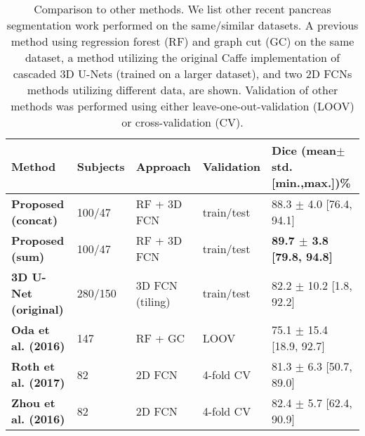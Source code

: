 \documentclass[a4paper]{spie}  %
\begin{document}
\begin{table}[htb]
\small
\centering
\caption{ Comparison to other methods. We list other recent pancreas segmentation work performed on the same/similar datasets. A previous method using regression forest (RF) and graph cut (GC)\cite{oda2016regression} on the same dataset, a method utilizing the original Caffe implementation of cascaded 3D U-Nets (trained on a larger dataset\cite{roth2017hierarchical}), and two 2D FCNs methods\cite{roth2017spatial,zhou2016pancreas} utilizing different data, are shown. Validation of other methods was performed using either leave-one-out-validation (LOOV) or cross-validation (CV).}
\label{tab:comparison}
  \vspace{1em}
\begin{tabular}{l|l|l|l|l}
\hline
\rowcolor[gray]{.9}\textbf{Method} & \textbf{Subjects} & \textbf{Approach} & \textbf{Validation} & \textbf{Dice (mean$\pm$std. [min.,max.])\%}\tabularnewline
\hline
\textbf{Proposed (concat)} 										& 100/47 	& RF + 3D FCN 		 & train/test & 88.3 $\pm$ 4.0 [76.4, 94.1]\tabularnewline
\rowcolor[gray]{.9}\textbf{Proposed (sum)} 		& 100/47 	& RF + 3D FCN 		 & train/test & \textbf{89.7 $\pm$ 3.8 [79.8, 94.8]}\tabularnewline
\textbf{3D U-Net (original)}\cite{roth2017hierarchical} 									& 280/150 & 3D FCN (tiling)  & train/test	& 82.2 $\pm$ 10.2 [1.8, 92.2]\tabularnewline
\rowcolor[gray]{.9}\textbf{Oda et al. (2016)}\cite{oda2016regression} & 147 		& RF + GC			 		 & LOOV				& 75.1 $\pm$ 15.4 [18.9, 92.7]\tabularnewline
\textbf{Roth et al. (2017)}\cite{roth2017spatial} 									& 82 			& 2D FCN 					 & 4-fold CV 	& 81.3 $\pm$ 6.3 [50.7, 89.0]\tabularnewline
\rowcolor[gray]{.9}\textbf{Zhou et al. (2016)}\cite{zhou2016pancreas} 									& 82 			& 2D FCN 					 & 4-fold CV 	& 82.4 $\pm$ 5.7 [62.4, 90.9]\tabularnewline
\hline
\end{tabular}
\end{table}
\end{document}
